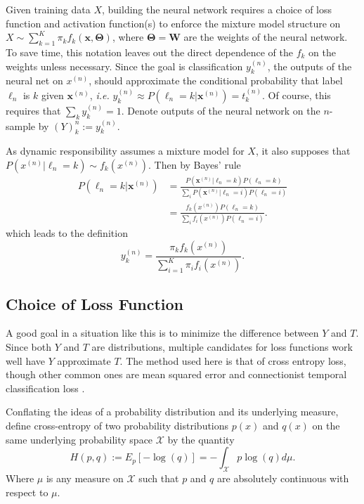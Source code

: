 Given training data $X$, building the neural network requires a choice of loss function and activation function(s) to enforce the mixture model structure on 
$X \sim \sum_{k=1}^{K}\pi_kf_k(\bm x,\bm\Theta)$, where $\bm\Theta = \bm W$ are the
weights of the neural network. To save time, this notation leaves out the direct dependence of 
the $f_k$ on the weights unless necessary. Since the goal is classification $y_k^{(n)}$, the outputs of the neural net on \( x^{(n)} \), should approximate the conditional probability that label $\ell_n$ is 
$k$ given $\bm x^{(n)}$, \textit{i.e.} $y_k^{(n)}\approx P(\ell_n=k|\bm x^{(n)}) = t_k^{(n)}$. 
Of course, this requires that $\sum_{k}y_k^{(n)} = 1$.  Denote outputs of the neural network  on the \( n \)-sample by \( (Y)_k^{n} :=  y_k^{(n)}\).

As dynamic responsibility assumes a mixture model for $X$, it also supposes that $P(x^{(n)}|\ell_n=k)\sim f_k(x^{(n)})$. Then by Bayes' rule 
\begin{align}
P(\ell_n=k|\bm x^{(n)}) &= \frac{P(\bm x^{(n)}|\ell_n=k)P(\ell_n=k)}{\sum_i P(\bm x^{(n)}|\ell_n=i) P(\ell_n=i)}\\ \nonumber
					    &= \frac{f_k(x^{(n)})P(\ell_n=k)}{\sum_i f_i(x^{(n)})P(\ell_n=i)}.
\end{align}                         
which leads to the definition 
\begin{equation}\label{Ydef}
y_k^{(n)}=\dfrac{\pi_k f_k(x^{(n)})}{\sum_{i=1}^{K}\pi_i f_i(x^{(n)})}.
\end{equation}

\subsection{Choice of Loss Function}
A good goal  in a situation like this is to minimize the difference between $Y$ 
and $T$. Since both $Y$ and $T$ are distributions, multiple candidates for loss functions work well
have $Y$ approximate $T$. The method used here is that of cross entropy loss, though other common ones are mean squared error \cite{Bishop1995} and connectionist temporal classification loss \cite{Graves06ctc}.  

Conflating the ideas of a probability distribution and its underlying measure, define cross-entropy of two probability distributions $p(x)$ and $q(x)$ on the same underlying probability space 
$\mathcal{X}$ by the quantity 
\begin{equation}\label{eqn:crossent}
H(p,q):= E_p[-\log (q)] = -\int_{\mathcal{X}} p\log (q) d\mu.
\end{equation}
Where $\mu$ is any measure on $\mathcal{X}$ such that $p$ and $q$ are absolutely
continuous with respect to $\mu$.

